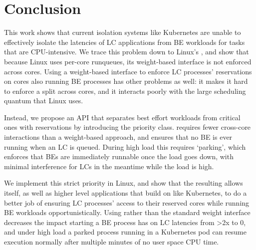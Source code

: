 \section{Conclusion}

This work shows that current isolation systems like Kubernetes are unable to
effectively isolate the latencies of LC applications from BE workloads for tasks
that are CPU-intensive. We trace this problem down to Linux's \cgroups{}, and
show that because Linux uses per-core runqueues, its weight-based interface is
not enforced across cores. Using a weight-based interface to enforce LC
processes' reservations on cores also running BE processes has other problems as
well: it makes it hard to enforce a split across cores, and it interacts poorly
with the large scheduling quantum that Linux uses.

Instead, we propose an API that separates best effort workloads from critical
ones with reservations by introducing the \beclass{} priority class. \beclass{}
requires fewer cross-core interactions than a weight-based approach, and ensures
that no BE is ever running when an LC is queued. During high load this requires
`parking', which enforces that BEs are immediately runnable once the load goes
down, with minimal interference for LCs in the meantime while the load is high.

We implement this strict priority in Linux, and show that the resulting
\schedbe{} allows \cgroups{} itself, as well as higher level applications that
build on \cgroups{} like Kubernetes, to do a better job of ensuring LC
processes' access to their reserved cores while running BE workloads
opportunistically. Using \schedbe{} rather than the standard \cgroups{} weight
interface decreases the impact starting a BE process has on LC latencies from
>2x to 0, and under high load a parked \schedbe{} process running in a
Kubernetes pod can resume execution normally after multiple minutes of no user
space CPU time.

